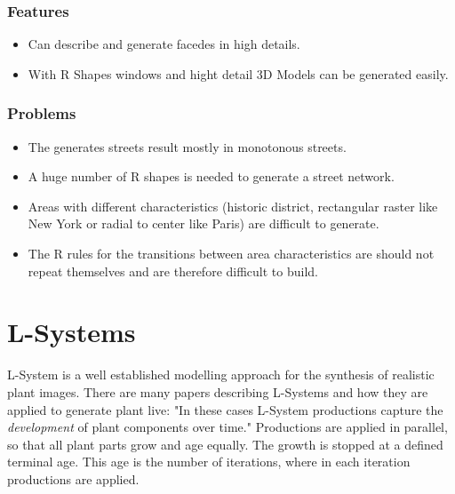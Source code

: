 \documentclass[11pt, a4paper]{report}
\begin{document}
\subsubsection{Features}
    \begin{itemize}
        \item Can describe and generate facedes in high details.
        \item With R Shapes windows and hight detail 3D Models can be generated easily.
    \end{itemize}

\subsubsection{Problems}
    \begin{itemize}
        \item The generates streets result mostly in monotonous streets. 
        \item A huge number of R shapes is needed to generate a street network.
        \item Areas with different characteristics (historic district, rectangular raster like New York or radial to center like Paris) are difficult to generate.
        \item The R rules for the transitions between area characteristics are should not repeat themselves and are therefore difficult to build.
    \end{itemize}

\pagebreak
\section{L-Systems}

L-System is a well established modelling approach for the synthesis of realistic plant images. There are many papers describing L-Systems and how they are applied to generate plant live: "In these cases L-System productions capture the \textit{development} of plant components over time." \citep{PrusinkiewiczEtAl:2001} Productions are applied in parallel, so that all plant parts grow and age equally. The growth is stopped at a defined terminal age. This age is the number of iterations, where in each iteration productions are applied.
\end{document}
